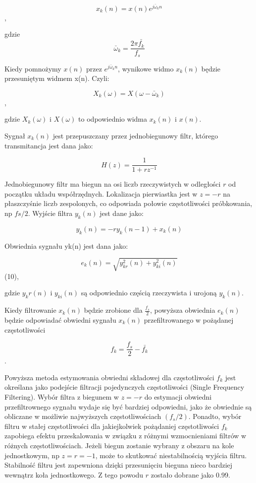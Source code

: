 \documentclass[eng,printmode]{mgr}
\begin{document}
 $$x_{k}(n) = x(n)e^{j\bar{\omega}_{k}n}$$,
 
 gdzie $$\bar{\omega}_{k} = \frac{2\pi\bar{f_{k}}}{f_{s}}$$
 
 Kiedy pomnożymy $x(n)$ przez $e^{j\bar{\omega}_{k}n}$, wynikowe widmo $x_{k}(n)$ będzie przesuniętym widmem x(n). Czyli:
 
 $$X_{k}(\omega) = X(\omega - \bar{\omega}_{k})$$,
 
 gdzie $X_{k}(\omega)$ i $X(\omega)$ to odpowiednio widma  $x_{k}(n)$ i $x(n)$.
 
 Sygnał $x_{k}(n)$ jest przepuszczany przez jednobiegunowy filtr, którego transmitancja jest dana jako:
 
 $$H(z) = \frac{1}{1+rz^{-1}}$$
 
 Jednobiegunowy filtr ma biegun na osi liczb rzeczywistych w odległości $r$ od początku układu współrzędnych. Lokalizacja pierwiastka jest w $z = -r$ na płaszczyśnie liczb zespolonych, co odpowiada połowie częstotliwości próbkowania, np $fs/2$. Wyjście filtra $y_{k}(n)$ jest dane jako:
 
 $$y_{k}(n) = -r y_{k}(n-1)+x_{k}(n)$$
 
  Obwiednia sygnału yk(n) jest dana jako:
  
  $$e_{k}(n) = \sqrt{y_{kr}^2(n) + y_{ki}^2(n)}$$ 			(10), 
  
  gdzie $y_kr(n)$ i $y_{ki}(n)$ są odpowiednio częścią rzeczywista i urojoną $y_{k}(n)$.
  
  Kiedy filtrowanie $x_{k}(n)$ będzie zrobione dla $\frac{f_{s}}{2}$, powyższa obwiednia $e_{k}(n)$ będzie odpowiadać obwiedni sygnału $x_{k}(n)$ przefiltrowanego w pożądanej częstotliwości
  
  $$f_{k} = \frac{f_{s}}{2} - \bar{f_{k}}$$.
  
  Powyższa metoda estymowania obwiedni składowej dla częstotliwości $f_{k}$ jest określana jako podejście filtracji pojedynczych częstotliwości (Single Frequency Filtering). Wybór filtra z biegunem w $z=-r$ do estymacji obwiedni przefiltrownego sygnału wydaje się być bardziej odpowiedni, jako że obwiednie są obliczane w możliwie najwyższych częstotliwościach $(f_{s}/2)$. Ponadto, wybór filtru w stałej częstotliwości dla jakiejkolwiek pożądaniej częstotliwości $f_{k}$ zapobiega efektu przeskalowania w związku z różnymi wzmocnieniami filtrów w różnych częstotliwościach. Jeżeli biegun zostanie wybrany z obszaru na kole jednostkowym, np $z=r=-1$, może to skutkować niestabilnością wyjścia filtru. Stabilność filtru jest zapewniona dzięki przesunięciu bieguna nieco bardziej wewnątrz koła jednostkowego. Z tego powodu $r$ zostało dobrane jako 0.99.
  
\end{document}
